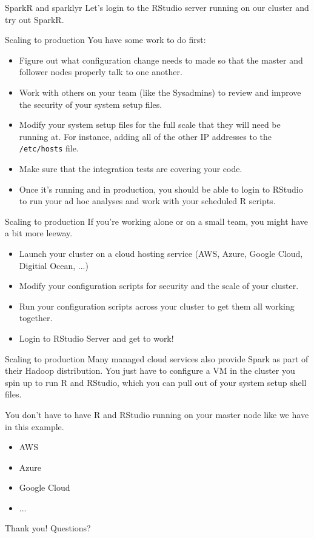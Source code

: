 \documentclass[pdf]{beamer}
\begin{document}
\begin{frame}{SparkR and sparklyr}
    Let's login to the RStudio server running on our cluster and try out SparkR.
\end{frame}

\begin{frame}{Scaling to production}
    You have some work to do first:
    \begin{itemize}
	\item Figure out what configuration change needs to made so that the master and follower nodes properly talk to one another.
	\item Work with others on your team (like the Sysadmins) to review and improve the security of your system setup files.
	\item Modify your system setup files for the full scale that they will need be running at. For instance, adding all of the other IP addresses to the \texttt{/etc/hosts} file.
	\item Make sure that the integration tests are covering your code.
	\item Once it's running and in production, you should be able to login to RStudio to run your ad hoc analyses and work with your scheduled R scripts.
    \end{itemize}
\end{frame}

\begin{frame}{Scaling to production}
    If you're working alone or on a small team, you might have a bit more leeway.
    \begin{itemize}
	\item Launch your cluster on a cloud hosting service (AWS, Azure, Google Cloud, Digitial Ocean, ...)
	\item Modify your configuration scripts for security and the scale of your cluster.
	\item Run your configuration scripts across your cluster to get them all working together.
	\item Login to RStudio Server and get to work!
    \end{itemize}
\end{frame}

\begin{frame}{Scaling to production}
    Many managed cloud services also provide Spark as part of their Hadoop distribution. You just have to configure a VM in the cluster you spin up to run R and RStudio, which you can pull out of your system setup shell files.

    You don't have to have R and RStudio running on your master node like we have in this example.
    \begin{itemize}
	\item AWS
	\item Azure
	\item Google Cloud
	\item ...
    \end{itemize}
\end{frame}

\begin{frame}{Thank you!}
Questions?
\end{frame}
\end{document}
